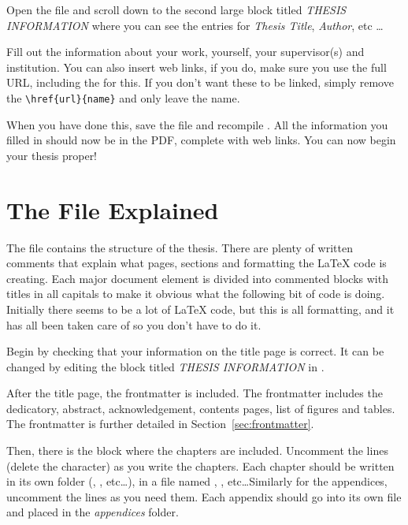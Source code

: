 Open the file and scroll down to the second large block titled \emph{THESIS INFORMATION} where you can see the entries for \emph{Thesis Title}, \emph{Author}, etc \ldots

Fill out the information about your work, yourself, your supervisor(s) and institution. You can also insert web links, if you do, make sure you use the full URL, including the  for this. If you don't want these to be linked, simply remove the \verb|\href{url}{name}| and only leave the name.

When you have done this, save the file and recompile . All the information you filled in should now be in the PDF, complete with web links. You can now begin your thesis proper!


\section{The  File Explained}

The  file contains the structure of the thesis. There are plenty of written comments that explain what pages, sections and formatting the \LaTeX{} code is creating. Each major document element is divided into commented blocks with titles in all capitals to make it obvious what the following bit of code is doing. Initially there seems to be a lot of \LaTeX{} code, but this is all formatting, and it has all been taken care of so you don't have to do it.

Begin by checking that your information on the title page is correct. It can be changed by editing the block titled \emph{THESIS INFORMATION} in . 

After the title page, the frontmatter is included. The frontmatter includes the dedicatory, abstract, acknowledgement, contents pages, list of figures and tables. The frontmatter is further detailed in Section~\ref{sec:frontmatter}.

Then, there is the block where the chapters are included. Uncomment the lines (delete the \code{\%} character) as you write the chapters. Each chapter should be written in its own folder (, , etc\ldots), in a file named , , etc\ldots Similarly for the appendices, uncomment the lines as you need them. Each appendix should go into its own file and placed in the \emph{appendices} folder.

